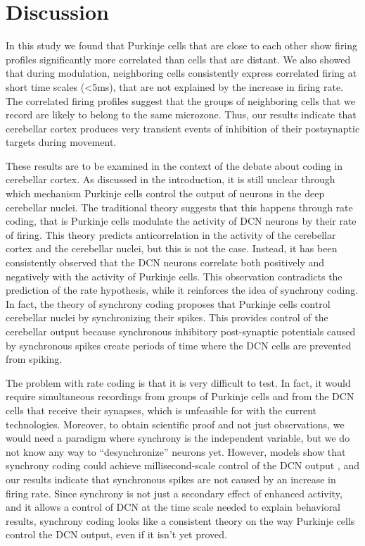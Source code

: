 \section{Discussion}

In this study we found that Purkinje cells that are close to each other show firing profiles significantly more correlated than cells that are distant. We also showed that during modulation, neighboring cells consistently express correlated firing at short time scales (<5ms), that are not explained by the increase in firing rate.
The correlated firing profiles suggest that the groups of neighboring cells that we record are likely to belong to the same microzone. Thus, our results indicate that cerebellar cortex produces very transient events of inhibition of their postsynaptic targets during movement.

These results are to be examined in the context of the debate about coding in cerebellar cortex. As discussed in the introduction, it is still unclear through which mechanism Purkinje cells control the output of neurons in the deep cerebellar nuclei. The traditional theory suggests that this happens through rate coding, that is Purkinje cells modulate the activity of DCN neurons by their rate of firing. This theory predicts anticorrelation in the activity of the cerebellar cortex and the cerebellar nuclei, but this is not the case. Instead, it has been consistently observed that the DCN neurons correlate both positively and negatively with the activity of Purkinje cells.
This observation contradicts the prediction of the rate hypothesis, while it reinforces the idea of synchrony coding. In fact, the theory of synchrony coding proposes that Purkinje cells control cerebellar nuclei by synchronizing their spikes. This provides control of the cerebellar output because synchronous inhibitory post-synaptic potentials caused by synchronous spikes create periods of time where the DCN cells are prevented from spiking.

The problem with rate coding is that it is very difficult to test. In fact, it would require simultaneous recordings from groups of Purkinje cells and from the DCN cells that receive their synapses, which is unfeasible for with the current technologies. Moreover, to obtain scientific proof and not just observations, we would need a paradigm where synchrony is the independent variable, but we do not know any way to ``desynchronize'' neurons yet. However, models show that synchrony coding could achieve millisecond-scale control of the DCN output \cite{person2012synchrony}, and our results indicate that synchronous spikes are not caused by an increase in firing rate. Since synchrony is not just a secondary effect of enhanced activity, and it allows a control of DCN at the time scale needed to explain behavioral results, synchrony coding looks like a consistent theory on the way Purkinje cells control the DCN output, even if it isn't yet proved.

